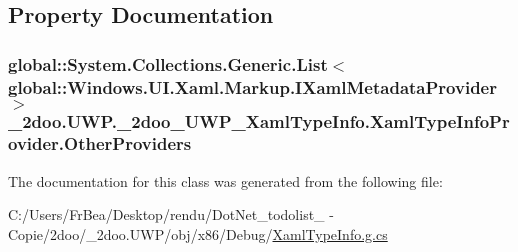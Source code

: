 \subsection{Property Documentation}
\hypertarget{class__2doo_1_1_u_w_p_1_1__2doo___u_w_p___xaml_type_info_1_1_xaml_type_info_provider_11604fabac4e9eb737a66513a87aa490}{
\subsubsection[{OtherProviders}]{\setlength{\rightskip}{0pt plus 5cm}global::System.Collections.Generic.List$<$global::Windows.UI.Xaml.Markup.IXamlMetadataProvider$>$ \_\-2doo.UWP.\_\-2doo\_\-UWP\_\-XamlTypeInfo.XamlTypeInfoProvider.OtherProviders}}
\label{class__2doo_1_1_u_w_p_1_1__2doo___u_w_p___xaml_type_info_1_1_xaml_type_info_provider_11604fabac4e9eb737a66513a87aa490}




The documentation for this class was generated from the following file:\begin{CompactItemize}
\item 
C:/Users/FrBea/Desktop/rendu/DotNet\_\-todolist\_ - Copie/2doo/\_\-2doo.UWP/obj/x86/Debug/\hyperlink{_xaml_type_info_8g_8cs}{XamlTypeInfo.g.cs}\end{CompactItemize}
